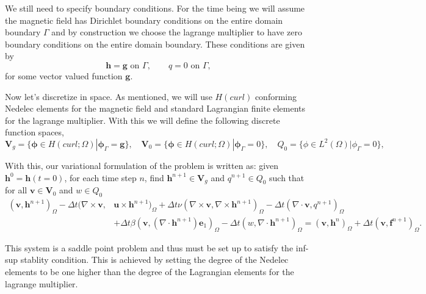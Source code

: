 \documentclass{article}
\begin{document}
        We still need to specify boundary conditions. For the time being we will assume the magnetic field has Dirichlet boundary conditions on the entire domain boundary $\Gamma$ and by construction we choose the lagrange multiplier to have zero boundary conditions on the entire domain boundary. These conditions are given by
        \[
            \boldsymbol{h} = \boldsymbol{g} \text{ on } \Gamma,\quad \quad q = 0 \text{ on } \Gamma,
        \]
        for some vector valued function $\boldsymbol{g}$.

        Now let's discretize in space. As mentioned, we will use $H(curl)$ conforming Nedelec elements for the magnetic field and standard Lagrangian finite elements for the lagrange multiplier. With this we will define the following discrete function spaces,
        \[
            \boldsymbol{V}_g = \{\boldsymbol{\phi}\in H(curl;\Omega) | \boldsymbol{\phi}_\Gamma = \boldsymbol{g}\},\quad
            \boldsymbol{V}_0 = \{\boldsymbol{\phi}\in H(curl;\Omega) | \boldsymbol{\phi}_\Gamma = 0\},\quad
            Q_0 = \{\phi \in L^2(\Omega) | \phi_\Gamma = 0\},
        \]

        With this, our variational formulation of the problem is written as: given $\boldsymbol{h}^0 =\boldsymbol{h}(t=0)$, for each time step $n$, find $\boldsymbol{h}^{n+1} \in \boldsymbol{V}_g$ and $q^{n+1} \in Q_0$ such that for all $\boldsymbol{v} \in \boldsymbol{V}_0$ and $w \in Q_0$
        \begin{align*}
            \left(\boldsymbol{v},\boldsymbol{h}^{n+1} \right)_\Omega
            -\Delta t (\nabla \times   \boldsymbol{v},&\boldsymbol{u}\times \boldsymbol{h}^{n+1})_\Omega
            +\Delta t \nu\left(\nabla \times\boldsymbol{v},\nabla \times \boldsymbol{h}^{n+1}\right)_\Omega
            - \Delta t \left(\nabla \cdot \boldsymbol{v},q^{n+1}\right)_\Omega \\
            &+ \Delta t \beta\left(\boldsymbol{v}, (\nabla \cdot \boldsymbol{h}^{n+1})\boldsymbol{e}_1\right)_\Omega
            -\Delta t\left(w,\nabla  \cdot \boldsymbol{h}^{n+1}\right)_\Omega = \left(\boldsymbol{v},\boldsymbol{h}^{n}\right)_\Omega +\Delta t (\boldsymbol{v},\boldsymbol{f}^{n+1})_\Omega.
        \end{align*}


        This system is a saddle point problem and thus must be set up to satisfy the inf-sup stablity condition. This is achieved by setting the degree of the Nedelec elements to be one higher than the degree of the Lagrangian elements for the lagrange multiplier.
\end{document}
